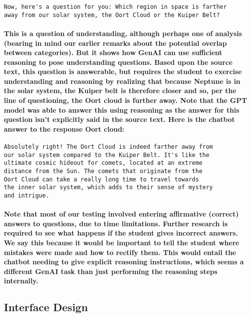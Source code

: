 \documentclass{article}
\begin{document}
\begin{verbatim}
Now, here's a question for you: Which region in space is farther
away from our solar system, the Oort Cloud or the Kuiper Belt?
\end{verbatim}

\paragraph{This is a question of understanding, although perhaps one of analysis (bearing in mind our earlier remarks about the potential overlap between categories). But it shows how GenAI can use sufficient reasoning to pose understanding questions. Based upon the source text, this question is answerable, but requires the student to exercise understanding and reasoning by realizing that because Neptune is in the solar system, the Kuiper belt is therefore closer and so, per the line of questioning, the Oort cloud is further away. Note that the GPT model was able to answer this using reasoning as the answer for this question isn’t explicitly said in the source text. Here is the chatbot answer to the response Oort cloud:\newline}

\begin{verbatim}
Absolutely right! The Oort Cloud is indeed farther away from
our solar system compared to the Kuiper Belt. It's like the
ultimate cosmic hideout for comets, located at an extreme
distance from the Sun. The comets that originate from the
Oort Cloud can take a really long time to travel towards
the inner solar system, which adds to their sense of mystery
and intrigue.
\end{verbatim}

\paragraph{Note that most of our testing involved entering affirmative (correct) answers to questions, due to time limitations. Further research is required to see what happens if the student gives incorrect answers. We say this because it would be important to tell the student where mistakes were made and how to rectify them. This would entail the chatbot needing to give explicit reasoning instructions, which seems a different GenAI task than just performing the reasoning steps internally.}

\subsection*{Interface Design}
\end{document}
